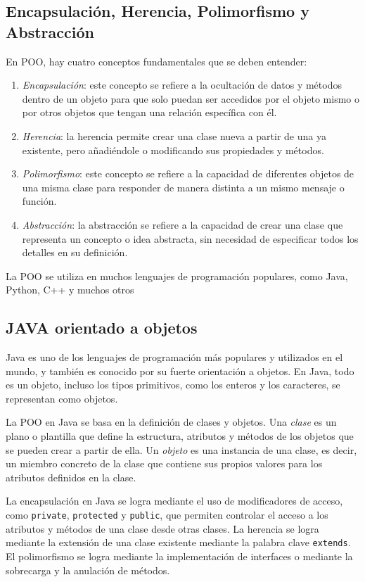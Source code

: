 \documentclass[executivepaper]{article}
\begin{document}
\subsection{Encapsulación, Herencia, Polimorfismo y Abstracción}
En POO, hay cuatro conceptos fundamentales que se deben entender:
\begin{enumerate}
    \item \textit{Encapsulación}: este concepto se refiere a la ocultación de datos y métodos dentro de un objeto para que solo puedan ser accedidos por el objeto mismo o por otros objetos que tengan una relación específica con él.
    \item \textit{Herencia}: la herencia permite crear una clase nueva a partir de una ya existente, pero añadiéndole o modificando sus propiedades y métodos.
    \item \textit{Polimorfismo}: este concepto se refiere a la capacidad de diferentes objetos de una misma clase para responder de manera distinta a un mismo mensaje o función.
    \item \textit{Abstracción}: la abstracción se refiere a la capacidad de crear una clase que representa un concepto o idea abstracta, sin necesidad de especificar todos los detalles en su definición.
\end{enumerate}
La POO se utiliza en muchos lenguajes de programación populares, como Java, Python, C++ y muchos otros

\subsection*{JAVA orientado a objetos}
Java es uno de los lenguajes de programación más populares y utilizados en el mundo, y también es conocido por su fuerte orientación a objetos. En Java, todo es un objeto, incluso los tipos primitivos, como los enteros y los caracteres, se representan como objetos.

La POO en Java se basa en la definición de clases y objetos. Una \textit{clase} es un plano o plantilla que define la estructura, atributos y métodos de los objetos que se pueden crear a partir de ella. Un \textit{objeto} es una instancia de una clase, es decir, un miembro concreto de la clase que contiene sus propios valores para los atributos definidos en la clase.

La encapsulación en Java se logra mediante el uso de modificadores de acceso, como \texttt{private}, \texttt{protected} y \texttt{public}, que permiten controlar el acceso a los atributos y métodos de una clase desde otras clases. La herencia se logra mediante la extensión de una clase existente mediante la palabra clave \texttt{extends}. El polimorfismo se logra mediante la implementación de interfaces o mediante la sobrecarga y la anulación de métodos.
\end{document}
